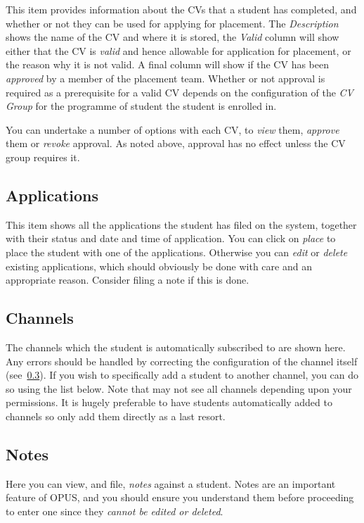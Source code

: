 \documentclass[12 pt]{book}
\begin{document}
This item provides information about the CVs that a student has completed, and
whether or not they can be used for applying for placement. The 
\emph{Description} shows the name of the CV and where it is stored, the 
\emph{Valid} column will show either that the CV is \emph{valid} and hence
allowable for application for placement, or the reason why it is not valid. A
final column will show if the CV has been \emph{approved} by a member of the
placement team. Whether or not approval is required as a prerequisite for a
valid CV depends on the configuration of the \emph{CV Group} for the programme
of student the student is enrolled in.

You can undertake a number of options with each CV, to \emph{view} them, 
\emph{approve} them or \emph{revoke} approval. As noted above, approval has
no effect unless the CV group requires it.

\subsection{Applications}

This item shows all the applications the student has filed on the system, 
together with their status and date and time of application. You can click on
\emph{place} to place the student with one of the applications. Otherwise you
can \emph{edit} or \emph{delete} existing applications, which should obviously
be done with care and an appropriate reason. Consider filing a note if this is
done.

\subsection{Channels}

The channels which the student is automatically subscribed to are shown here.
Any errors should be handled by correcting the configuration of the channel
itself (see~\ref{}). If you wish to specifically add a student to another
channel, you can do so using the list below. Note that may not see all channels
depending upon your permissions. It is hugely preferable to have students
automatically added to channels so only add them directly as a last resort.

\subsection{Notes}

Here you can view, and file, \emph{notes} against a student. Notes are an
important feature of OPUS, and you should ensure you understand them before
proceeding to enter one since they \emph{cannot be edited or deleted}.
\end{document}
